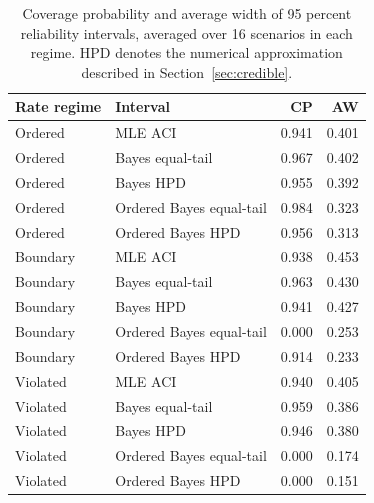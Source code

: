 \begin{table}[htbp]
\centering
\caption{Coverage probability and average width of 95 percent reliability intervals, averaged over 16 scenarios in each regime. HPD denotes the numerical approximation described in Section~\ref{sec:credible}.}\label{tab:intervals}
\small
\begin{tabular}{llrr}
\toprule
Rate regime & Interval & CP & AW \\
\midrule
Ordered & MLE ACI & 0.941 & 0.401 \\
Ordered & Bayes equal-tail & 0.967 & 0.402 \\
Ordered & Bayes HPD & 0.955 & 0.392 \\
Ordered & Ordered Bayes equal-tail & 0.984 & 0.323 \\
Ordered & Ordered Bayes HPD & 0.956 & 0.313 \\
Boundary & MLE ACI & 0.938 & 0.453 \\
Boundary & Bayes equal-tail & 0.963 & 0.430 \\
Boundary & Bayes HPD & 0.941 & 0.427 \\
Boundary & Ordered Bayes equal-tail & 0.000 & 0.253 \\
Boundary & Ordered Bayes HPD & 0.914 & 0.233 \\
Violated & MLE ACI & 0.940 & 0.405 \\
Violated & Bayes equal-tail & 0.959 & 0.386 \\
Violated & Bayes HPD & 0.946 & 0.380 \\
Violated & Ordered Bayes equal-tail & 0.000 & 0.174 \\
Violated & Ordered Bayes HPD & 0.000 & 0.151 \\
\bottomrule
\end{tabular}
\end{table}

